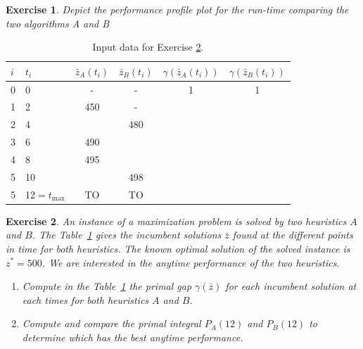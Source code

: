 \documentclass{article}
\newtheorem{exercise}{Exercise}[section]
\begin{document}
    \begin{exercise}
        Depict the performance profile plot for the run-time comparing the two algorithms A and B
        \begin{center}
        \end{center}
    \end{exercise}

    \begin{table}[h]
    \centering
    \begin{tabular}{|l|l|c|c|c|c|}
    \hline
    \( i \) & \( t_i \) & \( \bar{z}_A(t_i) \) & \( \bar{z}_B(t_i) \) & \( \gamma(\bar{z}_A(t_i)) \) & \( \gamma(\bar{z}_B(t_i)) \) \\
    \hline
    0 & 0 & - & - & 1 & 1 \\
    1 & 2 & 450 &  - & & \\
    2 & 4 &   & 480 & & \\
    3 & 6 & 490 &    & & \\
    4 & 8 & 495 &   & & \\
    5 & 10 &  & 498 & & \\
    5 & 12$=t_{\max}$ & TO & TO & & \\
    \hline
    \end{tabular}
    \caption{Input data for Exercise \ref{ex:anytime}.}
    \label{tab:anytime}
    \end{table}

    \begin{exercise}
        An instance of a maximization problem is solved by two heuristics $A$ and $B$.
        The Table~\ref{tab:anytime} gives the incumbent solutions \(\bar{z}\) found at the different points
        in time for both heuristics.
        The known optimal solution of the solved instance is \(z^* = 500\).
        We are interested in the anytime performance of the two heuristics.
        \begin{enumerate}
        \item Compute in the Table~\ref{tab:anytime} the primal gap \(\gamma(\bar{z})\)
              for each incumbent solution at each times for both heuristics $A$ and $B$.
        \item Compute and compare the primal integral \(P_A(12)\) and \(P_B(12)\)
              to determine which has the best anytime performance.
        \end{enumerate}
        \label{ex:anytime}
    \end{exercise}


    
    
\end{document}
